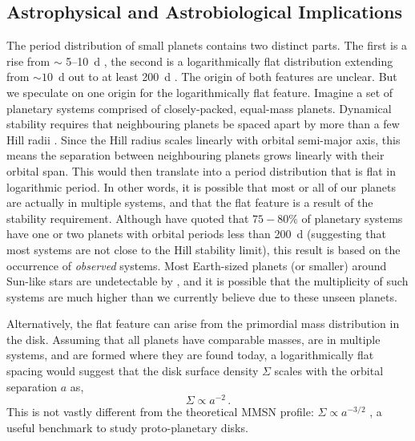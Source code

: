 \subsection{Astrophysical and Astrobiological Implications}
The period distribution of \kep{} small planets contains two distinct
parts. The first is a rise from  $\sim$ 5--10~d 
\citep[e.g.][]{Youdin,Howard2012}, the second is a
logarithmically flat distribution extending from $\sim 10$~d out to
at least 200~d \citep[Fig. \ref{fig:period}
here,][]{Petigura2013,Fressin2013}. The origin of both features are
unclear. But we speculate on one origin for the logarithmically flat feature.
Imagine a set of planetary systems comprised of
closely-packed, equal-mass planets. Dynamical stability requires that
neighbouring planets be spaced apart by more than a few Hill radii
\citep{Chambers,Smith2009}. Since the Hill radius scales linearly
with orbital semi-major axis, this means the separation between
neighbouring planets grows linearly with their orbital
span. This would then translate into a period
distribution that is flat in logarithmic period. In other words, it is
possible that most or all of our planets are actually in multiple
systems, and that the flat feature is a result of the stability
requirement. Although \citet{Fang12} have quoted that $75 - 80 \%$
of planetary systems have one or two planets with orbital periods less than 
200~d (suggesting that most systems are not close to the Hill stability limit), this
result is based on the occurrence of {\it observed} systems. Most Earth-sized
planets (or smaller) around Sun-like stars are undetectable by \kep{}, and
it is possible that the multiplicity of such systems are much higher than
we currently believe due to these unseen planets.

Alternatively, the flat feature can arise from the primordial mass
distribution in the disk. Assuming that all planets have comparable
masses, are in multiple systems, and are
formed where they are found today, a logarithmically flat
spacing would suggest that the disk surface density $\Sigma$ scales
with the orbital separation $a$ as,
\begin{equation}
\Sigma \propto a^{-2}\, .
\end{equation}
This is not vastly different from the theoretical MMSN profile:
$\Sigma \propto a^{-3/2}$ \citep{Hayashi1981,Weidenschilling1977}, a
useful benchmark to study proto-planetary disks.

